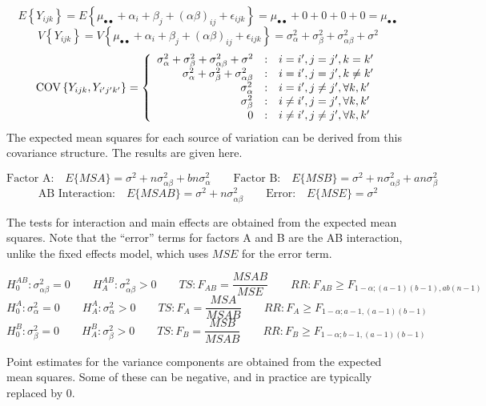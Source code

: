 \documentclass[
]{book}
\begin{document}
\[
E\left\{Y_{ijk}\right\} = E\left\{\mu_{\bullet\bullet} + \alpha_i + \beta_j + (\alpha\beta)_{ij} + \epsilon_{ijk}\right\}
= \mu_{\bullet\bullet} + 0 + 0 + 0 + 0 = \mu_{\bullet\bullet}
\] \[
V\left\{Y_{ijk}\right\} = V\left\{\mu_{\bullet\bullet} + \alpha_i + \beta_j + (\alpha\beta)_{ij} + \epsilon_{ijk}\right\} =
\sigma_{\alpha}^2 + \sigma_{\beta}^2 + \sigma_{\alpha\beta}^2 +  \sigma^2
\] \[
\mbox{COV}\left\{Y_{ijk},Y_{i'j'k'}\right\}=
\left\{ \begin{array}{r@{\quad:\quad}l}
    \sigma_{\alpha}^2 + \sigma_{\beta}^2 + \sigma_{\alpha\beta}^2 +  \sigma^2 & i=i',j=j',k=k' \\
    \sigma_{\alpha}^2 + \sigma_{\beta}^2 + \sigma_{\alpha\beta}^2 & i=i', j=j',k\ne k' \\
    \sigma_{\alpha}^2 & i=i',j\ne j', \forall k,k'\\
     \sigma_{\beta}^2&  i\ne i', j= j',\forall k,k' \\
     0 & i\ne i', j\ne j', \forall k,k' \\
    \end{array} \right.
\] The expected mean squares for each source of variation can be derived
from this covariance structure. The results are given here.

\[
\mbox{Factor A:} \quad E\{MSA\} = \sigma^2 + n\sigma_{\alpha\beta}^2+ bn\sigma_{\alpha}^2 
\qquad 
\mbox{Factor B:} \quad E\{MSB\} = \sigma^2 + n\sigma_{\alpha\beta}^2+ an\sigma_{\beta}^2 
\] \[
\mbox{AB Interaction:} \quad E\{MSAB\}=\sigma^2 + n\sigma_{\alpha\beta}^2
\qquad
\mbox{Error:} \quad E\{MSE\}=\sigma^2
\]

The tests for interaction and main effects are obtained from the
expected mean squares. Note that the ``error'' terms for factors A and B
are the AB interaction, unlike the fixed effects model, which uses
\(MSE\) for the error term.

\[
H_0^{AB}:\sigma_{\alpha\beta}^2 = 0 \qquad H_A^{AB}:\sigma_{\alpha\beta}^2 > 0 \qquad
TS:F_{AB}=\frac{MSAB}{MSE} \qquad RR:F_{AB}\geq F_{1-\alpha;(a-1)(b-1),ab(n-1)}
\] \[
H_0^{A}:\sigma_{\alpha}^2 = 0 \qquad H_A^{A}:\sigma_{\alpha}^2 > 0 \qquad
TS:F_{A}=\frac{MSA}{MSAB} \qquad RR:F_{A}\geq F_{1-\alpha;a-1,(a-1)(b-1)}
\] \[
H_0^{B}:\sigma_{\beta}^2 = 0 \qquad H_A^{B}:\sigma_{\beta}^2 > 0 \qquad
TS:F_{B}=\frac{MSB}{MSAB} \qquad RR:F_{B}\geq F_{1-\alpha;b-1,(a-1)(b-1)}
\]

Point estimates for the variance components are obtained from the
expected mean squares. Some of these can be negative, and in practice
are typically replaced by 0.
\end{document}
